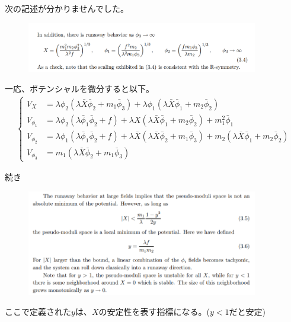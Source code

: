 \documentclass[
  unicode,a4paper,9pt,
  xcolor = {dvipsnames,svgnames},
  hyperref ={colorlinks=true,citecolor=Navy,linkcolor=NavyBlue,urlcolor=purple},
  ja=standard,lualatex
]{beamer}
\begin{document}
\begin{frame}

  次の記述が分かりませんでした。
  \begin{figure}
    \centering
    \includegraphics[width=0.9\textwidth]{fig/Shih2007avq1.PNG}
  \end{figure}

  一応、ポテンシャルを微分すると以下。
  \begin{align}
    \left\{
    \begin{alignedat}{1}
      V_{X}
      & =
      \lambda\phi_{2}(\lambda\bar{X}\bar{\phi}_{2}+m_{1}\bar{\phi}_{3})
      +
      \lambda\phi_{1}(\lambda\bar{X}\bar{\phi}_{1}+m_{2}\bar{\phi}_{2})
      \nonumber
      \\
      V_{\phi_{1}}
      & =
      \lambda\phi_{2}(\lambda\bar{\phi}_{1}\bar{\phi}_{2}+f)
      +
      \lambda X(\lambda\bar{X}\bar{\phi}_{1}+m_{2}\bar{\phi}_{2})
      +
      m_{1}^{2}\bar{\phi}_{1}
      \nonumber
      \\
      V_{\phi_{2}}
      & =
      \lambda\phi_{1}(\lambda\bar{\phi}_{1}\bar{\phi}_{2}+f)
      +
      \lambda\bar{X}(\lambda\bar{X}\bar{\phi}_{2}+m_{1}\bar{\phi}_{3})
      +
      m_{2}(\lambda\bar{X}\bar{\phi}_{1}+m_{2}\bar{\phi}_{2})
      \nonumber
      \\
      V_{\phi_{3}}
      & =
      m_{1}(\lambda \bar{X}\bar{\phi}_{2}+m_{1}\bar{\phi}_{3})
      \nonumber
    \end{alignedat}
    \right.
    \nonumber
  \end{align}

\end{frame}

\begin{frame}

  続き
  \begin{figure}
    \centering
    \includegraphics[width=0.9\textwidth]{fig/Shih2007avq2.PNG}
  \end{figure}

  ここで定義された$y$は、$X$の安定性を表す指標になる。($y<1$だと安定)

\end{frame}
\end{document}
